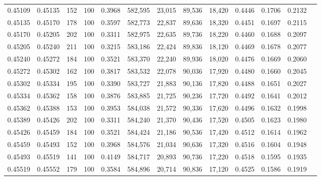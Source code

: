 \begin{tabular}{rrrrrrrrrrrrr}
0.45109 & 0.45135 &   152 & 100 &                                     0.3968 & 582,595 &  23,015 &  89,536 &  18,420 & 0.4446 & 0.1706 & 0.2132 \\
0.45135 & 0.45170 &   178 & 100 &                                     0.3597 & 582,773 &  22,837 &  89,636 &  18,320 & 0.4451 & 0.1697 & 0.2115 \\
0.45170 & 0.45205 &   202 & 100 &                                     0.3311 & 582,975 &  22,635 &  89,736 &  18,220 & 0.4460 & 0.1688 & 0.2097 \\
0.45205 & 0.45240 &   211 & 100 &                                     0.3215 & 583,186 &  22,424 &  89,836 &  18,120 & 0.4469 & 0.1678 & 0.2077 \\
0.45240 & 0.45272 &   184 & 100 &                                     0.3521 & 583,370 &  22,240 &  89,936 &  18,020 & 0.4476 & 0.1669 & 0.2060 \\
0.45272 & 0.45302 &   162 & 100 &                                     0.3817 & 583,532 &  22,078 &  90,036 &  17,920 & 0.4480 & 0.1660 & 0.2045 \\
0.45302 & 0.45334 &   195 & 100 &                                     0.3390 & 583,727 &  21,883 &  90,136 &  17,820 & 0.4488 & 0.1651 & 0.2027 \\
0.45334 & 0.45362 &   158 & 100 &                                     0.3876 & 583,885 &  21,725 &  90,236 &  17,720 & 0.4492 & 0.1641 & 0.2012 \\
0.45362 & 0.45388 &   153 & 100 &                                     0.3953 & 584,038 &  21,572 &  90,336 &  17,620 & 0.4496 & 0.1632 & 0.1998 \\
0.45389 & 0.45426 &   202 & 100 &                                     0.3311 & 584,240 &  21,370 &  90,436 &  17,520 & 0.4505 & 0.1623 & 0.1980 \\
0.45426 & 0.45459 &   184 & 100 &                                     0.3521 & 584,424 &  21,186 &  90,536 &  17,420 & 0.4512 & 0.1614 & 0.1962 \\
0.45459 & 0.45493 &   152 & 100 &                                     0.3968 & 584,576 &  21,034 &  90,636 &  17,320 & 0.4516 & 0.1604 & 0.1948 \\
0.45493 & 0.45519 &   141 & 100 &                                     0.4149 & 584,717 &  20,893 &  90,736 &  17,220 & 0.4518 & 0.1595 & 0.1935 \\
0.45519 & 0.45552 &   179 & 100 &                                     0.3584 & 584,896 &  20,714 &  90,836 &  17,120 & 0.4525 & 0.1586 & 0.1919 \\

\end{tabular}
